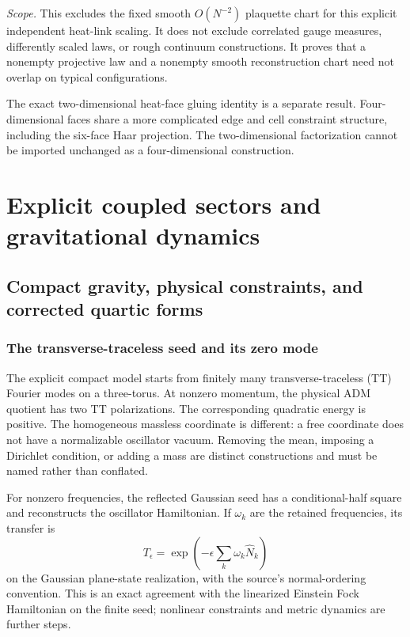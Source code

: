 \documentclass[11pt,a4paper,oneside]{book}
\theoremstyle{plain}
\theoremstyle{definition}
\theoremstyle{remark}
\newcommand{\src}[2]{\cite{#1}}
\newcommand{\scope}[1]{\par\smallskip\noindent\textit{Scope.} #1\par\smallskip}
\begin{document}
\scope{This excludes the fixed smooth $O(N^{-2})$ plaquette chart for this explicit independent heat-link scaling. It does not exclude correlated gauge measures, differently scaled laws, or rough continuum constructions. It proves that a nonempty projective law and a nonempty smooth reconstruction chart need not overlap on typical configurations.}

The exact two-dimensional heat-face gluing identity is a separate result. Four-dimensional faces share a more complicated edge and cell constraint structure, including the six-face Haar projection. The two-dimensional factorization cannot be imported unchanged as a four-dimensional construction. \cite{R19}


\part{Explicit coupled sectors and gravitational dynamics}
\chapter{Compact gravity, physical constraints, and corrected quartic forms}
\label{ch:compact}
\section{The transverse-traceless seed and its zero mode}
The explicit compact model starts from finitely many transverse-traceless (TT) Fourier modes on a three-torus. At nonzero momentum, the physical ADM quotient has two TT polarizations. The corresponding quadratic energy is positive. The homogeneous massless coordinate is different: a free coordinate does not have a normalizable oscillator vacuum. Removing the mean, imposing a Dirichlet condition, or adding a mass are distinct constructions and must be named rather than conflated. \cite{R19}

For nonzero frequencies, the reflected Gaussian seed has a conditional-half square and reconstructs the oscillator Hamiltonian. If $\omega_k$ are the retained frequencies, its transfer is
\begin{equation}
 T_\epsilon=\exp\!\left(-\epsilon\sum_k\omega_k\widehat N_k\right)
 \label{eq:tt-transfer}
\end{equation}
on the Gaussian plane-state realization, with the source's normal-ordering convention. This is an exact agreement with the linearized Einstein Fock Hamiltonian on the finite seed; nonlinear constraints and metric dynamics are further steps. \src{R19}{thm:v19v64-consolidated}
\end{document}
